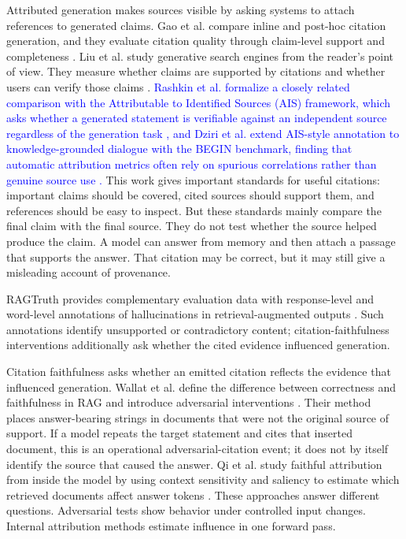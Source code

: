 \documentclass[a4paper,fleqn]{cas-sc}
\begin{document}
Attributed generation makes sources visible by asking systems to attach references to generated claims. Gao et al. compare inline and post-hoc citation generation, and they evaluate citation quality through claim-level support and completeness \cite{gao2023citations}. Liu et al. study generative search engines from the reader's point of view. They measure whether claims are supported by citations and whether users can verify those claims \cite{liu2023verifiability}. \textcolor{blue}{Rashkin et al. formalize a closely related comparison with the Attributable to Identified Sources (AIS) framework, which asks whether a generated statement is verifiable against an independent source regardless of the generation task \cite{rashkin2023measuring}, and Dziri et al. extend AIS-style annotation to knowledge-grounded dialogue with the BEGIN benchmark, finding that automatic attribution metrics often rely on spurious correlations rather than genuine source use \cite{dziri2022begin}.} This work gives important standards for useful citations: important claims should be covered, cited sources should support them, and references should be easy to inspect. But these standards mainly compare the final claim with the final source. They do not test whether the source helped produce the claim. A model can answer from memory and then attach a passage that supports the answer. That citation may be correct, but it may still give a misleading account of provenance.

RAGTruth provides complementary evaluation data with response-level and word-level annotations of hallucinations in retrieval-augmented outputs \cite{niu2024ragtruth}. Such annotations identify unsupported or contradictory content; citation-faithfulness interventions additionally ask whether the cited evidence influenced generation.

Citation faithfulness asks whether an emitted citation reflects the evidence that influenced generation. Wallat et al. define the difference between correctness and faithfulness in RAG and introduce adversarial interventions \cite{wallat2025correctness}. Their method places answer-bearing strings in documents that were not the original source of support. If a model repeats the target statement and cites that inserted document, this is an operational adversarial-citation event; it does not by itself identify the source that caused the answer. Qi et al. study faithful attribution from inside the model by using context sensitivity and saliency to estimate which retrieved documents affect answer tokens \cite{qi2024mirage}. These approaches answer different questions. Adversarial tests show behavior under controlled input changes. Internal attribution methods estimate influence in one forward pass.
\end{document}
